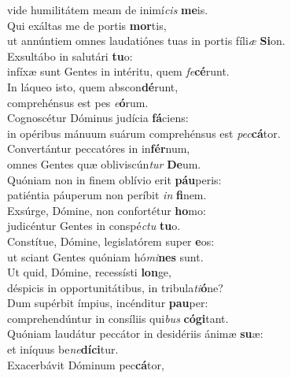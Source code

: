 \oddverse vide humilitátem meam de inimí\textit{cis} \textbf{me}is.\\
\evenverse Qui exáltas me de portis \textbf{mor}tis,~\*\\
\evenverse ut annúntiem omnes laudatiónes tuas in portis fíli\textit{æ} \textbf{Si}on.\\
\oddverse Exsultábo in salutári \textbf{tu}o:~\*\\
\oddverse infíxæ sunt Gentes in intéritu, quem \textit{fe}\textbf{cé}runt.\\
\evenverse In láqueo isto, quem abscon\textbf{dé}runt,~\*\\
\evenverse comprehénsus est pes \textit{e}\textbf{ó}rum.\\
\oddverse Cognoscétur Dóminus judícia \textbf{fá}ciens:~\*\\
\oddverse in opéribus mánuum suárum comprehénsus est \textit{pec}\textbf{cá}tor.\\
\evenverse Convertántur peccatóres in in\textbf{fér}num,~\*\\
\evenverse omnes Gentes quæ obliviscún\textit{tur} \textbf{De}um.\\
\oddverse Quóniam non in finem oblívio erit \textbf{páu}peris:~\*\\
\oddverse patiéntia páuperum non períbit \textit{in} \textbf{fi}nem.\\
\evenverse Exsúrge, Dómine, non confortétur \textbf{ho}mo:~\*\\
\evenverse judicéntur Gentes in conspé\textit{ctu} \textbf{tu}o.\\
\oddverse Constítue, Dómine, legislatórem super \textbf{e}os:~\*\\
\oddverse ut sciant Gentes quóniam hó\textit{mi}\textbf{nes} sunt.\\
\evenverse Ut quid, Dómine, recessísti \textbf{lon}ge,~\*\\
\evenverse déspicis in opportunitátibus, in tribula\textit{ti}\textbf{ó}ne?\\
\oddverse Dum supérbit ímpius, incénditur \textbf{pau}per:~\*\\
\oddverse comprehendúntur in consíliis qui\textit{bus} \textbf{có}\textbf{gi}tant.\\
\evenverse Quóniam laudátur peccátor in desidériis ánimæ \textbf{su}æ:~\*\\
\evenverse et iníquus be\textit{ne}\textbf{dí}\textbf{ci}tur.\\
\oddverse Exacerbávit Dóminum pec\textbf{cá}tor,~\*\\
